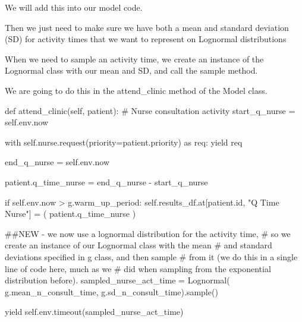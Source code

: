\documentclass[
  letterpaper,
  DIV=11,
  numbers=noendperiod]{scrreprt}
\newenvironment{Shaded}{}{}
\newcommand{\BuiltInTok}[1]{\textcolor[rgb]{0.84,0.23,0.29}{#1}}
\newcommand{\CommentTok}[1]{\textcolor[rgb]{0.42,0.45,0.49}{#1}}
\newcommand{\ControlFlowTok}[1]{\textcolor[rgb]{0.84,0.23,0.29}{#1}}
\newcommand{\ImportTok}[1]{\textcolor[rgb]{0.01,0.18,0.38}{#1}}
\newcommand{\KeywordTok}[1]{\textcolor[rgb]{0.84,0.23,0.29}{#1}}
\newcommand{\NormalTok}[1]{\textcolor[rgb]{0.14,0.16,0.18}{#1}}
\newcommand{\OperatorTok}[1]{\textcolor[rgb]{0.14,0.16,0.18}{#1}}
\newcommand{\StringTok}[1]{\textcolor[rgb]{0.01,0.18,0.38}{#1}}
\newcommand{\VariableTok}[1]{\textcolor[rgb]{0.89,0.38,0.04}{#1}}
\begin{document}
We will add this into our model code.

Then we just need to make sure we have both a mean and standard
deviation (SD) for activity times that we want to represent on Lognormal
distributions

When we need to sample an activity time, we create an instance of the
Lognormal class with our mean and SD, and call the sample method.

We are going to do this in the attend\_clinic method of the Model class.

\begin{Shaded}
\begin{Highlighting}[]
\KeywordTok{def}\NormalTok{ attend\_clinic(}\VariableTok{self}\NormalTok{, patient):}
        \CommentTok{\# Nurse consultation activity}
\NormalTok{        start\_q\_nurse }\OperatorTok{=} \VariableTok{self}\NormalTok{.env.now}

        \ControlFlowTok{with} \VariableTok{self}\NormalTok{.nurse.request(priority}\OperatorTok{=}\NormalTok{patient.priority) }\ImportTok{as}\NormalTok{ req:}
            \ControlFlowTok{yield}\NormalTok{ req}

\NormalTok{            end\_q\_nurse }\OperatorTok{=} \VariableTok{self}\NormalTok{.env.now}

\NormalTok{            patient.q\_time\_nurse }\OperatorTok{=}\NormalTok{ end\_q\_nurse }\OperatorTok{{-}}\NormalTok{ start\_q\_nurse}

            \ControlFlowTok{if} \VariableTok{self}\NormalTok{.env.now }\OperatorTok{\textgreater{}}\NormalTok{ g.warm\_up\_period:}
                \VariableTok{self}\NormalTok{.results\_df.at[patient.}\BuiltInTok{id}\NormalTok{, }\StringTok{"Q Time Nurse"}\NormalTok{] }\OperatorTok{=}\NormalTok{ (}
\NormalTok{                    patient.q\_time\_nurse}
\NormalTok{                )}

            \CommentTok{\#\#NEW {-} we now use a lognormal distribution for the activity time,}
            \CommentTok{\# so we create an instance of our Lognormal class with the mean}
            \CommentTok{\# and standard deviations specified in g class, and then sample}
            \CommentTok{\# from it (we do this in a single line of code here, much as we}
            \CommentTok{\# did when sampling from the exponential distribution before).}
\NormalTok{            sampled\_nurse\_act\_time }\OperatorTok{=}\NormalTok{ Lognormal(}
\NormalTok{                g.mean\_n\_consult\_time, g.sd\_n\_consult\_time).sample()}

            \ControlFlowTok{yield} \VariableTok{self}\NormalTok{.env.timeout(sampled\_nurse\_act\_time)}
\end{Highlighting}
\end{Shaded}
\end{document}
